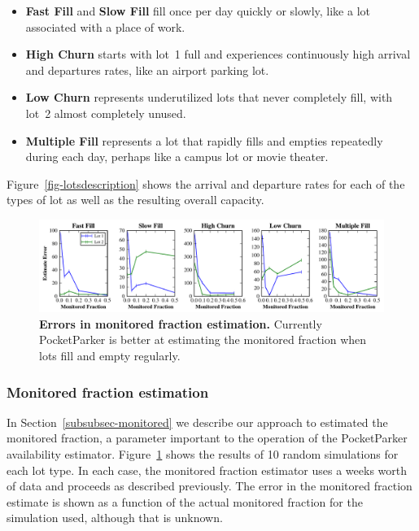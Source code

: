 \begin{itemize}

\item \textbf{Fast Fill} and \textbf{Slow Fill} fill once per day quickly or
slowly, like a lot associated with a place of work.

\item \textbf{High Churn} starts with lot~1 full and experiences continuously
high arrival and departures rates, like an airport parking lot.

\item \textbf{Low Churn} represents underutilized lots that never completely
fill, with lot~2 almost completely unused.

\item \textbf{Multiple Fill} represents a lot that rapidly fills and empties
repeatedly during each day, perhaps like a campus lot or movie theater.

\end{itemize}

Figure~\ref{fig-lotsdescription} shows the arrival and departure rates for each
of the types of lot as well as the resulting overall capacity.

\begin{figure}
\centering
\includegraphics[width=\textwidth]{./simulator/figures/capacity_experiment.pdf}

\caption{\textbf{Errors in monitored fraction estimation.} Currently
PocketParker is better at estimating the monitored fraction when lots fill
and empty regularly.}

\label{fig-capacityerrors}
\end{figure}

\subsubsection{Monitored fraction estimation}

In Section~\ref{subsubsec-monitored} we describe our approach to estimated
the monitored fraction, a parameter important to the operation of the
PocketParker availability estimator. Figure~\ref{fig-capacityerrors} shows
the results of 10 random simulations for each lot type. In each case, the
monitored fraction estimator uses a weeks worth of data and proceeds as
described previously. The error in the monitored fraction estimate is shown
as a function of the actual monitored fraction for the simulation used,
although that is unknown.

